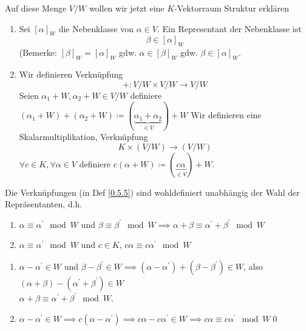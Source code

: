 Auf diese Menge $ V / W $ wollen wir jetzt eine $ K $-Vektorraum Struktur erklären

\begin{subdefinition}
	\begin{enumerate}[label=(\arabic*)]
		\item Sei $ [\alpha]_W $ die Nebenklasse von $ \alpha \in V $. Ein Representant der Nebenklasse ist 
			\[ \beta \in [\alpha]_W \]
			(Bemerke: $ [\beta]_W = [\alpha]_W $ gdw. $ \alpha \in [\beta]_W $ gdw. $ \beta \in [\alpha]_W $.
		\item Wir definieren Verknüpfung
			\[
				+ : V / W \times V / W \to V / W
			\]
			Seien $ \alpha_1 + W, \alpha_2 + W \in V / W $ definiere $ (\alpha_1 + W) + (\alpha_2 + W) \coloneqq (\underbrace{\alpha_1 + \alpha_2}_{\in V}) + W $ 
			Wir definieren eine Skalarmultiplikation, Verknüpfung
			\[
				K \times ( V / W ) \to ( V / W )
			\]
			$ \forall c \in K, \forall \alpha \in V  $ definiere $ c(\alpha + W) \coloneqq (\underbrace{c\alpha}_{\in V}) + W $.
	\end{enumerate}
\end{subdefinition}

\begin{sublemma}
	Die Verknüpfungen (in Def \ref{0.5.5}) sind wohldefiniert unabhängig der Wahl der Repräsentanten, d.h. 
	\begin{enumerate}[label=(\alph*)]
		\item $ \alpha \equiv \alpha^\prime \mod W $ und $ \beta \equiv \beta^\prime \mod W \implies \alpha + \beta \equiv \alpha^\prime + \beta^\prime \mod W $ 
		\item $ \alpha \equiv \alpha^\prime \mod W $ und $ c \in K $, $ c \alpha \equiv c\alpha^\prime \mod W $
	\end{enumerate}
\end{sublemma}

\begin{subproof*}
	\begin{enumerate}[label=(\alph*)]
		\item $ \alpha - \alpha^\prime \in W $ und $ \beta - \beta^\prime \in W \implies (\alpha - \alpha^{ \prime  } ) + ( \beta - \beta^{ \prime  } ) \in W $, also $ (\alpha + \beta) - (\alpha^\prime + \beta^\prime ) \in W $ \\
			$ \alpha + \beta \equiv \alpha^\prime + \beta^\prime \mod W $.
		\item $ \alpha - \alpha^\prime \in W \implies  c(\alpha - \alpha^\prime ) \implies  c\alpha - c\alpha^\prime  \in W \implies c\alpha \equiv c\alpha^\prime \mod W $\qed
	\end{enumerate}
\end{subproof*}

